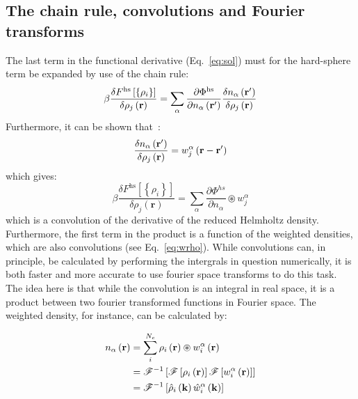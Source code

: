 \documentclass[12pt, letterpaper]{article}
\newcommand*{\lb}{\ensuremath{\left(}}
\newcommand*{\rb}{\ensuremath{\right)}}
\begin{document}
\subsection{The chain rule, convolutions and Fourier transforms}
The last term in the functional derivative (Eq.~\ref{eq:sol}) must for the hard-sphere term be expanded by use of the chain rule:
\begin{equation}
  \beta\frac{\delta F^{\text{hs}}\left[\left\{\rho_i\right\}\right]}{\delta\rho_j\left(\mathbf{r}\right)}
  =\sum_\alpha\frac{\partial\Phi^{\text{hs}}}{\partial n_\alpha\lb\mathbf{r}^\prime\rb}\frac{\delta n_\alpha\left(\mathbf{r}^\prime\right)}{\delta \rho_j\lb\mathbf{r}\rb}
\end{equation}
Furthermore, it can be shown that~\cite{stierle2020a}:
\begin{equation}
\frac{\delta n_\alpha\left(\mathbf{r}^\prime\right)}{\delta \rho_j\lb\mathbf{r}\rb}=w_j^\alpha\lb\mathbf{r}-\mathbf{r}^\prime\rb
\end{equation}
which gives:
\begin{equation}
  \beta\frac{\delta F^{\text{hs}}\left[\left\{\rho_i\right\}\right]}{\delta\rho_j\left(\mathbf{r}\right)}=\sum_\alpha\frac{\partial \Phi^{hs}}{\partial n_\alpha} \circledast w_j^\alpha
  \label{eq:conv2}
\end{equation}
which is a convolution of the derivative of the reduced Helmholtz density. Furthermore, the first term in the product is a function of the weighted densities, which are also convolutions (see Eq.~\ref{eq:wrho}). While convolutions can, in principle, be calculated by performing the intergrals in question numerically, it is both faster and more accurate to use fourier space transforms to do this task. The idea here is that while the convolution is an integral in real space, it is a product between two fourier transformed functions in Fourier space. The weighted density, for instance, can be calculated by:

\begin{equation}
  \begin{split}
    n_\alpha\left(\mathbf{r}\right)&=\sum_i^{N_c}\rho_i \lb\mathbf{r}\rb \circledast w_i^\alpha\lb\mathbf{r}\rb \\
    &= \mathscr{F}^{-1}\left[\mathscr{F}\left[\rho_i\lb\mathbf{r}\rb\right]\mathscr{F}\left[w_i^\alpha\lb\mathbf{r}\rb\right]\right]\\
    &= \mathscr{F}^{-1}\left[\hat{\rho}_i\left(\mathbf{k}\right)\hat{w}_i^\alpha\left(\mathbf{k}\right)\right]\\
  \end{split}
  \label{eq:Fourier}
\end{equation}
\end{document}

